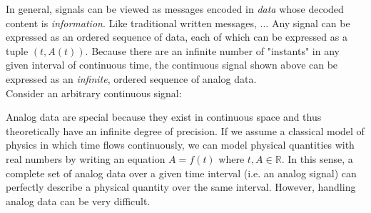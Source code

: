 
In general, signals can be viewed as messages encoded in \textit{data} whose decoded content is \textit{information}. Like traditional written messages, ... Any signal can be expressed as an ordered sequence of data, each of which can be expressed as a tuple $(t,A(t))$. Because there are an infinite number of "instants" in any given interval of continuous time, the continuous signal shown above can be expressed as an \textit{infinite}, ordered sequence of analog data. \\


Consider an arbitrary continuous signal:


\begin{center}
\end{center}

Analog data are special because they exist in continuous space and thus theoretically have an infinite degree of precision. If we assume a classical model of physics in which time flows continuously, we can model physical quantities with real numbers by writing an equation $A=f(t)$ where $t,A\in\mathbb{R}$. In this sense, a complete set of analog data over a given time interval (i.e. an analog signal) can perfectly describe a physical quantity over the same interval. However, handling analog data can be very difficult. \\


